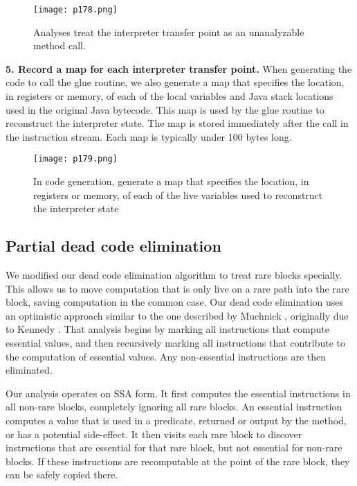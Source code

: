 \begin{figure}[H]
	\centering
	\texttt{[image: p178.png]}
	\caption{Analyses treat the interpreter transfer point as an unanalyzable method call.}
	\label{fig:p178}
\end{figure}

\textbf{5. Record a map for each interpreter transfer
point.}
When generating the code to call the glue routine, we
also generate a map that specifies the location, in registers or memory, of each of the local variables and
Java stack locations used in the original Java bytecode.
This map is used by the glue routine to reconstruct the
interpreter state. The map is stored immediately after the call in the instruction stream. Each map is
typically under 100 bytes long.


\begin{figure}[H]
	\centering
	\texttt{[image: p179.png]}
	\caption{In code generation, generate a map that specifies the location, in registers
    or memory, of each of the live variables used to reconstruct the interpreter state}
	\label{fig:p179}
\end{figure}




\subsection{Partial dead code elimination}

We modified our dead code elimination algorithm to treat
rare blocks specially. This allows us to move computation
that is only live on a rare path into the rare block, saving
computation in the common case.
Our dead code elimination uses an optimistic approach similar to the one described by Muchnick \cite{muchnick1997advanced}, originally due to
Kennedy \cite{kennedy1979survey}. That analysis begins by marking all instructions that compute essential values, and then recursively marking all instructions that contribute to the computation
of essential values. Any non-essential instructions are then
eliminated.

Our analysis operates on SSA form. It first computes the
essential instructions in all non-rare blocks, completely ignoring all rare blocks. An essential instruction computes a
value that is used in a predicate, returned or output by the
method, or has a potential side-effect.
It then visits each
rare block to discover instructions that are essential for that
rare block, but not essential for non-rare blocks. If these
instructions are recomputable at the point of the rare block,
they can be safely copied there.


